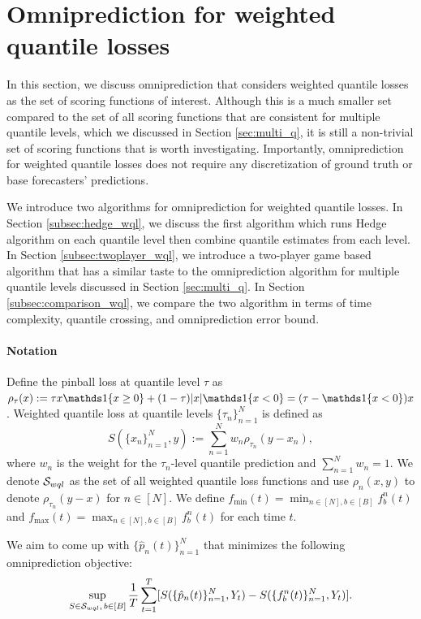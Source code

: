 \section{Omniprediction for weighted quantile losses} \label{sec:multi_wql}
In this section, we discuss omniprediction that considers weighted quantile losses as the set of scoring functions of interest. Although this is a much smaller set compared to the set of all scoring functions that are consistent for multiple quantile levels, which we discussed in Section \ref{sec:multi_q}, it is still a non-trivial set of scoring functions that is worth investigating. Importantly, omniprediction for weighted quantile losses does not require any discretization of ground truth or base forecasters' predictions. 

We introduce two algorithms for omniprediction for weighted quantile losses. In Section \ref{subsec:hedge_wql}, we discuss the first algorithm which runs Hedge algorithm on each quantile level then combine quantile estimates from each level. In Section \ref{subsec:twoplayer_wql}, we introduce a two-player game based algorithm that has a similar taste to the omniprediction algorithm for multiple quantile levels discussed in Section \ref{sec:multi_q}. In Section \ref{subsec:comparison_wql}, we compare the two algorithm in terms of time complexity, quantile crossing, and omniprediction error bound.


\paragraph{Notation}
Define the pinball loss at quantile level $\tau$ as $\rho_\tau(x) := \tau x\indi{x \geq 0} +(1-\tau)|x|\indi{x < 0} = (\tau - \indi{x < 0})x$. Weighted quantile loss at quantile levels $\{\tau_n\}_{n=1}^N$ is defined as 
\[
S(\{x_n\}_{n=1}^N, y) := \sum_{n=1}^N w_n \rho_{\tau_n}(y - x_n),
\]
where $w_n$ is the weight for the $\tau_n$-level quantile prediction and $\sum_{n=1}^N w_n = 1$. We denote $\mathcal{S}_{wql}$ as the set of all weighted quantile loss functions and use $\rho_n(x, y)$ to denote $\rho_{\tau_n}(y-x)$ for $n \in [N]$. We define $f_\text{min}(t) = \min_{n \in [N], b \in [B]} f_b^n(t)$ and $f_\text{max}(t) = \max_{n \in [N], b \in [B]} f_b^n(t)$ for each time $t$. \smallskip

We aim to come up with $\{\hat{p}_n(t)\}_{n=1}^N$ that minimizes the following omniprediction objective:
\[
\sup_{S \in \mathcal{S}_{wql},\, b \in [B]} \frac{1}{T} \sum_{t=1}^T [S(\{\hat{p}_n(t)\}_{n=1}^N, Y_t) - S(\{f_b^n(t)\}_{n=1}^N, Y_t)].
\]




